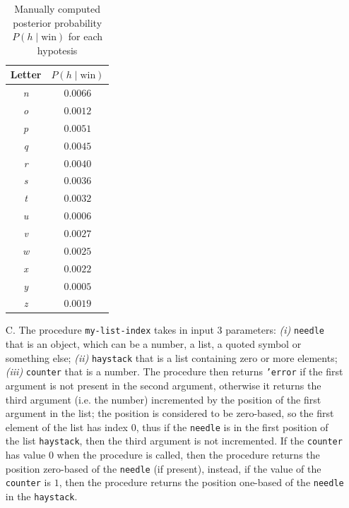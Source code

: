 \begin{itemize}
\begin{table}[H]
\begin{minipage}{.4\linewidth}
\begin{tabular}{c c}
                    \hline
                    \textbf{Letter} & $P(h\;|\;\text{win})$ \\
                    \hline
                    \textit{n} & $0.0066$ \\
                    \textit{o} & $0.0012$ \\
                    \textit{p} & $0.0051$ \\
                    \textit{q} & $0.0045$ \\
                    \textit{r} & $0.0040$ \\
                    \textit{s} & $0.0036$ \\
                    \textit{t} & $0.0032$ \\
                    \textit{u} & $0.0006$ \\
                    \textit{v} & $0.0027$ \\
                    \textit{w} & $0.0025$ \\
                    \textit{x} & $0.0022$ \\
                    \textit{y} & $0.0005$ \\
                    \textit{z} & $0.0019$ \\
                    \hline
                \end{tabular}
            \end{minipage}
            
            \caption{Manually computed posterior probability $P(h\;|\;\text{win})$ for each hypotesis}
            \label{tab:casino-game}
        \end{table}
    \item[C.] The procedure \texttt{my-list-index} takes in input 3 parameters: \textit{(i)} \texttt{needle} that is an object, 
        which can be a number, a list, a quoted symbol or something else; \textit{(ii)} \texttt{haystack} that is a list containing zero 
        or more elements; \textit{(iii)} \texttt{counter} that is a number. 
        The procedure then returns \texttt{'error} if the first argument is not present in the second argument, otherwise it returns the
        third argument (i.e. the number) incremented by the position of the first argument in the list; the position is considered to be
        zero-based, so the first element of the list has index $0$, thus if the \texttt{needle} is in the first position of the list 
        \texttt{haystack}, then the third argument is not incremented. If the \texttt{counter} has value $0$ when the procedure is 
        called, then the procedure returns the position zero-based of the \texttt{needle} (if present), instead, if the value of the
        \texttt{counter} is $1$, then the procedure returns the position one-based of the \texttt{needle} in the \texttt{haystack}.
    

\end{itemize}
